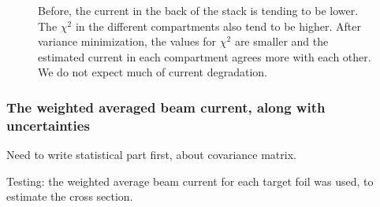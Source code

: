 \documentclass[a4paper,11pt,twoside]{book}
\begin{document}
\begin{figure}%
    \centering
    \quad
    \caption{Before, the current in the back of the stack is tending to be lower. The $\chi^2$ in the different compartments also tend to be higher. After variance minimization, the values for $\chi^2$ are smaller and the estimated current in each compartment agrees more with each other. We do not expect much of current degradation.}%
    \label{fig:varmin_beamcurrent}%
\end{figure}


\subsubsection{The weighted averaged beam current, along with uncertainties}

Need to write statistical part first, about covariance matrix. 


Testing: the weighted average beam current for each target foil was used, to estimate the cross section. 
\end{document}
